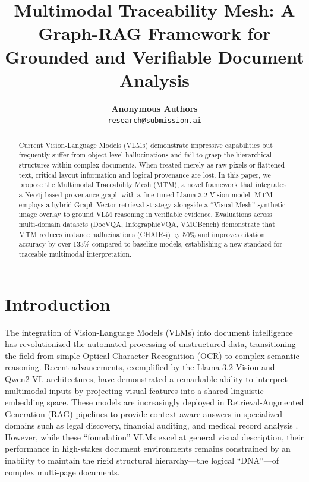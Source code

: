 \documentclass[11pt]{article}
\title{\textbf{Multimodal Traceability Mesh: A Graph-RAG Framework for Grounded and Verifiable Document Analysis}}
\author{
  \textbf{Anonymous Authors} \\
  \texttt{research@submission.ai}
}
\date{}
\begin{document}
\maketitle

\begin{abstract}
Current Vision-Language Models (VLMs) demonstrate impressive capabilities but frequently suffer from object-level hallucinations and fail to grasp the hierarchical structures within complex documents. When treated merely as raw pixels or flattened text, critical layout information and logical provenance are lost. In this paper, we propose the Multimodal Traceability Mesh (MTM), a novel framework that integrates a Neo4j-based provenance graph with a fine-tuned Llama 3.2 Vision model. MTM employs a hybrid Graph-Vector retrieval strategy alongside a ``Visual Mesh'' synthetic image overlay to ground VLM reasoning in verifiable evidence. Evaluations across multi-domain datasets (DocVQA, InfographicVQA, VMCBench) demonstrate that MTM reduces instance hallucinations (CHAIR-i) by 50\% and improves citation accuracy by over 133\% compared to baseline models, establishing a new standard for traceable multimodal interpretation.
\end{abstract}

\section{Introduction}
The integration of Vision-Language Models (VLMs) into document intelligence has revolutionized the automated processing of unstructured data, transitioning the field from simple Optical Character Recognition (OCR) to complex semantic reasoning. Recent advancements, exemplified by the Llama 3.2 Vision and Qwen2-VL architectures, have demonstrated a remarkable ability to interpret multimodal inputs by projecting visual features into a shared linguistic embedding space. These models are increasingly deployed in Retrieval-Augmented Generation (RAG) pipelines to provide context-aware answers in specialized domains such as legal discovery, financial auditing, and medical record analysis \citep{Lee2024}. However, while these ``foundation'' VLMs excel at general visual description, their performance in high-stakes document environments remains constrained by an inability to maintain the rigid structural hierarchy---the logical ``DNA''---of complex multi-page documents.
\end{document}
